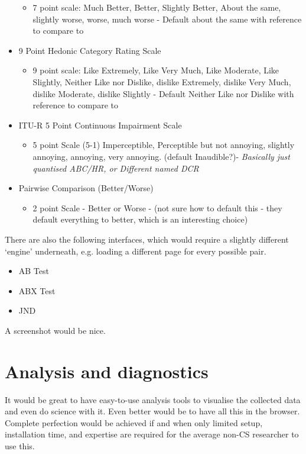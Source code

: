 \documentclass{sig-alternate}
\begin{document}
\begin{itemize}
\begin{itemize}
			\item 7 point scale: Much Better, Better, Slightly Better, About the same, slightly worse, worse, much worse - Default about the same with reference to compare to
		\end{itemize}
		\item 9 Point Hedonic Category Rating Scale~\cite{peryam1952advanced}
		\begin{itemize}
			\item 9 point scale: Like Extremely, Like Very Much, Like Moderate, Like Slightly, Neither Like nor Dislike, dislike Extremely, dislike Very Much, dislike Moderate, dislike Slightly  - Default Neither Like nor Dislike with reference to compare to
		\end{itemize}
		\item ITU-R 5 Point Continuous Impairment Scale~\cite{rec1997bs}
		\begin{itemize}
			\item 5 point Scale (5-1) Imperceptible, Perceptible but not annoying, slightly annoying, annoying, very annoying. (default Inaudible?)- {\it Basically just quantised ABC/HR, or Different named DCR}
		\end{itemize}
		\item Pairwise Comparison (Better/Worse)~\cite{david1963method}
		\begin{itemize}
			\item 2 point Scale - Better or Worse - (not sure how to default this - they default everything to better, which is an interesting choice)
		\end{itemize}
	\end{itemize}
	
	There are also the following interfaces, which would require a slightly different `engine' underneath, e.g. loading a different page for every possible pair. 
	\begin{itemize}
		\item AB Test~\cite{lipshitz1981great}
		\item ABX Test~\cite{clark1982high}
		\item JND
	\end{itemize}
	
	A screenshot would be nice. 

\section{Analysis and diagnostics}
	It would be great to have easy-to-use analysis tools to visualise the collected data and even do science with it. Even better would be to have all this in the browser. Complete perfection would be achieved if and when only limited setup, installation time, and expertise are required for the average non-CS researcher to use this. 
	
\end{document}
